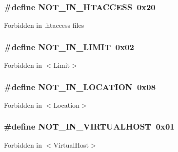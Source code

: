 \subsubsection[{\texorpdfstring{N\+O\+T\+\_\+\+I\+N\+\_\+\+H\+T\+A\+C\+C\+E\+SS}{NOT_IN_HTACCESS}}]{\setlength{\rightskip}{0pt plus 5cm}\#define N\+O\+T\+\_\+\+I\+N\+\_\+\+H\+T\+A\+C\+C\+E\+SS~0x20}\hypertarget{group__ap__check__cmd__context_ga534fc327ccfb4bdde3f7a9cd10fb4c36}{}\label{group__ap__check__cmd__context_ga534fc327ccfb4bdde3f7a9cd10fb4c36}
Forbidden in .htaccess files 
\subsubsection[{\texorpdfstring{N\+O\+T\+\_\+\+I\+N\+\_\+\+L\+I\+M\+IT}{NOT_IN_LIMIT}}]{\setlength{\rightskip}{0pt plus 5cm}\#define N\+O\+T\+\_\+\+I\+N\+\_\+\+L\+I\+M\+IT~0x02}\hypertarget{group__ap__check__cmd__context_ga719b0485f484e54e0f55f2abec186b49}{}\label{group__ap__check__cmd__context_ga719b0485f484e54e0f55f2abec186b49}
Forbidden in $<$Limit$>$ 
\subsubsection[{\texorpdfstring{N\+O\+T\+\_\+\+I\+N\+\_\+\+L\+O\+C\+A\+T\+I\+ON}{NOT_IN_LOCATION}}]{\setlength{\rightskip}{0pt plus 5cm}\#define N\+O\+T\+\_\+\+I\+N\+\_\+\+L\+O\+C\+A\+T\+I\+ON~0x08}\hypertarget{group__ap__check__cmd__context_gaec20d774050acd11912e6932d2df651e}{}\label{group__ap__check__cmd__context_gaec20d774050acd11912e6932d2df651e}
Forbidden in $<$Location$>$ 
\subsubsection[{\texorpdfstring{N\+O\+T\+\_\+\+I\+N\+\_\+\+V\+I\+R\+T\+U\+A\+L\+H\+O\+ST}{NOT_IN_VIRTUALHOST}}]{\setlength{\rightskip}{0pt plus 5cm}\#define N\+O\+T\+\_\+\+I\+N\+\_\+\+V\+I\+R\+T\+U\+A\+L\+H\+O\+ST~0x01}\hypertarget{group__ap__check__cmd__context_ga319e4b6d3c0b0999ba0f2811a6e12682}{}\label{group__ap__check__cmd__context_ga319e4b6d3c0b0999ba0f2811a6e12682}
Forbidden in $<$Virtual\+Host$>$ 

